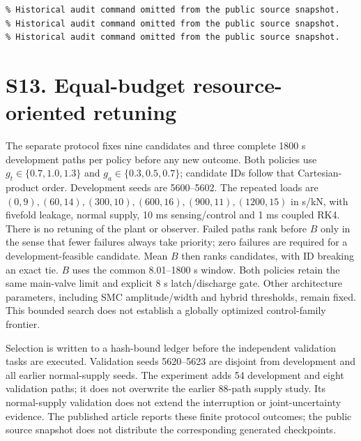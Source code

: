 \documentclass[11pt,a4paper]{article}
\begin{document}
\begin{verbatim}
% Historical audit command omitted from the public source snapshot.
% Historical audit command omitted from the public source snapshot.
% Historical audit command omitted from the public source snapshot.
\end{verbatim}

\section*{S13. Equal-budget resource-oriented retuning}\renewcommand{\theHtable}{retuning.\arabic{table}}
The separate protocol fixes nine candidates and three complete 1800 s development paths per policy before any new outcome. Both policies use $g_t\in\{0.7,1.0,1.3\}$ and $g_a\in\{0.3,0.5,0.7\}$; candidate IDs follow that Cartesian-product order. Development seeds are 5600--5602. The repeated loads are $(0,9),(60,14),(300,10),(600,16),(900,11),(1200,15)$ in s/kN, with fivefold leakage, normal supply, 10 ms sensing/control and 1 ms coupled RK4. There is no retuning of the plant or observer. Failed paths rank before $B$ only in the sense that fewer failures always take priority; zero failures are required for a development-feasible candidate. Mean $B$ then ranks candidates, with ID breaking an exact tie. $B$ uses the common 8.01--1800 s window. Both policies retain the same main-valve limit and explicit 8 s latch/discharge gate. Other architecture parameters, including SMC amplitude/width and hybrid thresholds, remain fixed. This bounded search does not establish a globally optimized control-family frontier.

Selection is written to a hash-bound ledger before the independent validation tasks are executed. Validation seeds 5620--5623 are disjoint from development and all earlier normal-supply seeds. The experiment adds 54 development and eight validation paths; it does not overwrite the earlier 88-path supply study. Its normal-supply validation does not extend the interruption or joint-uncertainty evidence. The published article reports these finite protocol outcomes; the public source snapshot does not distribute the corresponding generated checkpoints.
\end{document}
